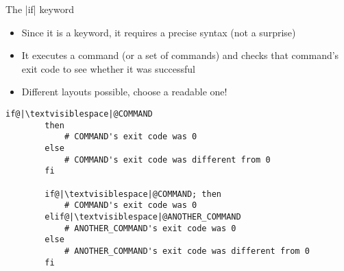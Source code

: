\begin{frame}[fragile]{The \bash|if| keyword}
    \vspace{-3mm}
    \begin{itemize}
        \item Since it is a keyword, it requires a precise syntax (not a surprise)
        \item It executes a command (or a set of commands) and checks that command's exit code to see whether it was successful
        \item Different layouts possible, choose a readable one!
    \end{itemize}
    
    \begin{lstlisting}[style=MyBash, numbers=none]
        if@|\textvisiblespace|@COMMAND
        then
            # COMMAND's exit code was 0
        else
            # COMMAND's exit code was different from 0
        fi
        
        if@|\textvisiblespace|@COMMAND; then
            # COMMAND's exit code was 0
        elif@|\textvisiblespace|@ANOTHER_COMMAND
            # ANOTHER_COMMAND's exit code was 0
        else
            # ANOTHER_COMMAND's exit code was different from 0
        fi
    \end{lstlisting}
\end{frame}

